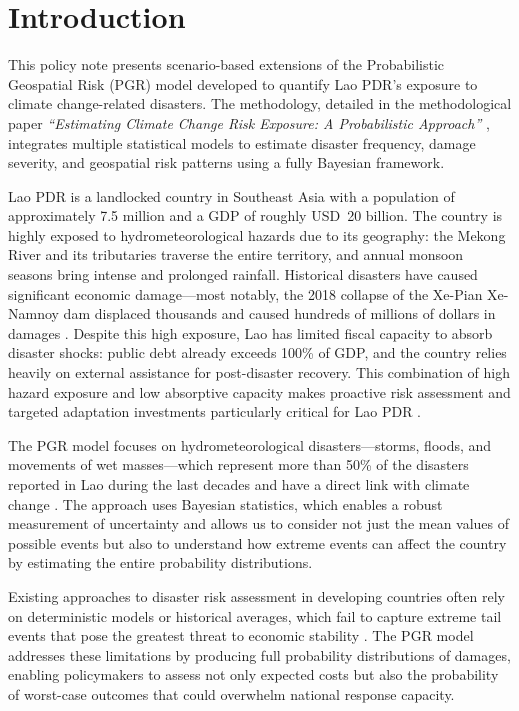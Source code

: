 \documentclass[11pt,a4paper]{article}
\begin{document}
\newpage

\section{Introduction}

This policy note presents scenario-based extensions of the Probabilistic Geospatial Risk (PGR) model developed to quantify Lao PDR's exposure to climate change-related disasters. The methodology, detailed in the methodological paper \textit{``Estimating Climate Change Risk Exposure: A Probabilistic Approach''} \cite{saldarriaga2026}, integrates multiple statistical models to estimate disaster frequency, damage severity, and geospatial risk patterns using a fully Bayesian framework.

Lao PDR is a landlocked country in Southeast Asia with a population of approximately 7.5 million and a GDP of roughly USD~20 billion. The country is highly exposed to hydrometeorological hazards due to its geography: the Mekong River and its tributaries traverse the entire territory, and annual monsoon seasons bring intense and prolonged rainfall. Historical disasters have caused significant economic damage---most notably, the 2018 collapse of the Xe-Pian Xe-Namnoy dam displaced thousands and caused hundreds of millions of dollars in damages \cite{emdat2024, laopdr_pdna2018}. Despite this high exposure, Lao has limited fiscal capacity to absorb disaster shocks: public debt already exceeds 100\% of GDP, and the country relies heavily on external assistance for post-disaster recovery. This combination of high hazard exposure and low absorptive capacity makes proactive risk assessment and targeted adaptation investments particularly critical for Lao PDR \cite{ipcc2022ar6wg2}.

The PGR model focuses on hydrometeorological disasters---storms, floods, and movements of wet masses---which represent more than 50\% of the disasters reported in Lao during the last decades and have a direct link with climate change \cite{lopez2015, vanaalst2006}. The approach uses Bayesian statistics, which enables a robust measurement of uncertainty and allows us to consider not just the mean values of possible events but also to understand how extreme events can affect the country by estimating the entire probability distributions.

Existing approaches to disaster risk assessment in developing countries often rely on deterministic models or historical averages, which fail to capture extreme tail events that pose the greatest threat to economic stability \cite{cavallo2011, howard2017}. The PGR model addresses these limitations by producing full probability distributions of damages, enabling policymakers to assess not only expected costs but also the probability of worst-case outcomes that could overwhelm national response capacity.
\end{document}
